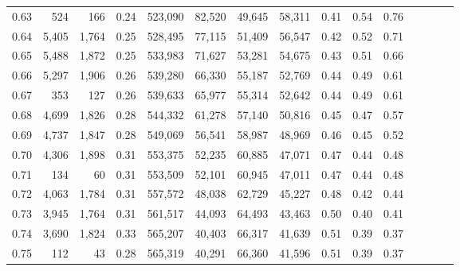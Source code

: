 \begin{tabular}{rrrcrrrrrrrrrrr}
0.63 &     524 &     166 &                                       0.24 &  523,090 &   82,520 &   49,645 &   58,311 &  0.41 &  0.54 &                         0.76 \\
0.64 &   5,405 &   1,764 &                                       0.25 &  528,495 &   77,115 &   51,409 &   56,547 &  0.42 &  0.52 &                         0.71 \\
0.65 &   5,488 &   1,872 &                                       0.25 &  533,983 &   71,627 &   53,281 &   54,675 &  0.43 &  0.51 &                         0.66 \\
0.66 &   5,297 &   1,906 &                                       0.26 &  539,280 &   66,330 &   55,187 &   52,769 &  0.44 &  0.49 &                         0.61 \\
0.67 &     353 &     127 &                                       0.26 &  539,633 &   65,977 &   55,314 &   52,642 &  0.44 &  0.49 &                         0.61 \\
0.68 &   4,699 &   1,826 &                                       0.28 &  544,332 &   61,278 &   57,140 &   50,816 &  0.45 &  0.47 &                         0.57 \\
0.69 &   4,737 &   1,847 &                                       0.28 &  549,069 &   56,541 &   58,987 &   48,969 &  0.46 &  0.45 &                         0.52 \\
0.70 &   4,306 &   1,898 &                                       0.31 &  553,375 &   52,235 &   60,885 &   47,071 &  0.47 &  0.44 &                         0.48 \\
0.71 &     134 &      60 &                                       0.31 &  553,509 &   52,101 &   60,945 &   47,011 &  0.47 &  0.44 &                         0.48 \\
0.72 &   4,063 &   1,784 &                                       0.31 &  557,572 &   48,038 &   62,729 &   45,227 &  0.48 &  0.42 &                         0.44 \\
0.73 &   3,945 &   1,764 &                                       0.31 &  561,517 &   44,093 &   64,493 &   43,463 &  0.50 &  0.40 &                         0.41 \\
0.74 &   3,690 &   1,824 &                                       0.33 &  565,207 &   40,403 &   66,317 &   41,639 &  0.51 &  0.39 &                         0.37 \\
0.75 &     112 &      43 &                                       0.28 &  565,319 &   40,291 &   66,360 &   41,596 &  0.51 &  0.39 &                         0.37 \\

\end{tabular}
